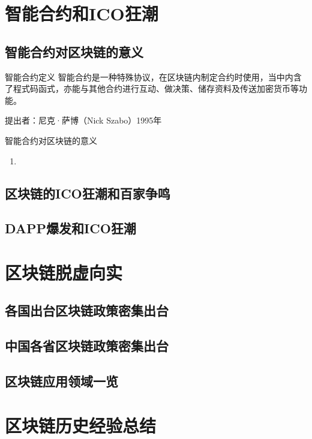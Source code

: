 \documentclass[11pt]{beamer}
\begin{document}
\section{智能合约和ICO狂潮}
\subsection{智能合约对区块链的意义}
\begin{frame}{智能合约定义}
	智能合约是一种特殊协议，在区块链内制定合约时使用，当中内含了程式码函式，亦能与其他合约进行互动、做决策、储存资料及传送加密货币等功能。
	
	提出者：尼克·萨博（Nick Szabo）1995年
\end{frame}

\begin{frame}{智能合约对区块链的意义}
	\begin{enumerate}
		\item 
	\end{enumerate}
\end{frame}
\subsection{区块链的ICO狂潮和百家争鸣}
\subsection{DAPP爆发和ICO狂潮}

\section{区块链脱虚向实}
\subsection{各国出台区块链政策密集出台}
\subsection{中国各省区块链政策密集出台}
\subsection{区块链应用领域一览}

\section{区块链历史经验总结}
\end{document}
